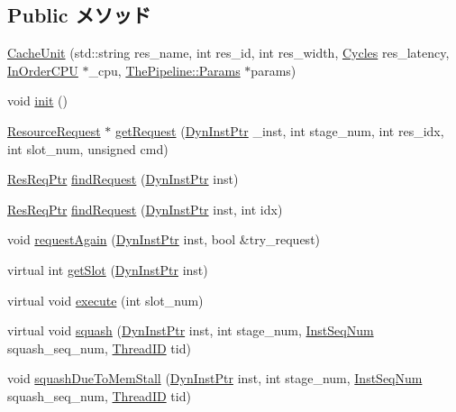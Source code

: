 \subsection*{Public メソッド}
\begin{DoxyCompactItemize}
\item 
\hyperlink{classCacheUnit_a24b18d6f820e0babe90abbfc838fc61c}{CacheUnit} (std::string res\_\-name, int res\_\-id, int res\_\-width, \hyperlink{classCycles}{Cycles} res\_\-latency, \hyperlink{classInOrderCPU}{InOrderCPU} $\ast$\_\-cpu, \hyperlink{namespaceThePipeline_ab62ca16eeca26566ad2422b5df4943ce}{ThePipeline::Params} $\ast$params)
\item 
void \hyperlink{classCacheUnit_a02fd73d861ef2e4aabb38c0c9ff82947}{init} ()
\item 
\hyperlink{classResourceRequest}{ResourceRequest} $\ast$ \hyperlink{classCacheUnit_aae5ce84f94a1057d7f60172daf5d731d}{getRequest} (\hyperlink{classRefCountingPtr}{DynInstPtr} \_\-inst, int stage\_\-num, int res\_\-idx, int slot\_\-num, unsigned cmd)
\item 
\hyperlink{classResourceRequest}{ResReqPtr} \hyperlink{classCacheUnit_ae3afc1c63d17a49a6301bd18fca574a0}{findRequest} (\hyperlink{classRefCountingPtr}{DynInstPtr} inst)
\item 
\hyperlink{classResourceRequest}{ResReqPtr} \hyperlink{classCacheUnit_abfbefbe2451158a25d064523dcb3d6bd}{findRequest} (\hyperlink{classRefCountingPtr}{DynInstPtr} inst, int idx)
\item 
void \hyperlink{classCacheUnit_a9063fd6f97e36e3565247339ffa3882c}{requestAgain} (\hyperlink{classRefCountingPtr}{DynInstPtr} inst, bool \&try\_\-request)
\item 
virtual int \hyperlink{classCacheUnit_ab3ba2ee95c723c8c056db0a1f2a6dfd3}{getSlot} (\hyperlink{classRefCountingPtr}{DynInstPtr} inst)
\item 
virtual void \hyperlink{classCacheUnit_a7b7fff82f8c9cbdb02add1346f60bb9e}{execute} (int slot\_\-num)
\item 
virtual void \hyperlink{classCacheUnit_a52235c5e3d912452f254dc45f1496fd2}{squash} (\hyperlink{classRefCountingPtr}{DynInstPtr} inst, int stage\_\-num, \hyperlink{inst__seq_8hh_a258d93d98edaedee089435c19ea2ea2e}{InstSeqNum} squash\_\-seq\_\-num, \hyperlink{base_2types_8hh_ab39b1a4f9dad884694c7a74ed69e6a6b}{ThreadID} tid)
\item 
void \hyperlink{classCacheUnit_ae2d6fba25ece343caad6eb029a4a3b5b}{squashDueToMemStall} (\hyperlink{classRefCountingPtr}{DynInstPtr} inst, int stage\_\-num, \hyperlink{inst__seq_8hh_a258d93d98edaedee089435c19ea2ea2e}{InstSeqNum} squash\_\-seq\_\-num, \hyperlink{base_2types_8hh_ab39b1a4f9dad884694c7a74ed69e6a6b}{ThreadID} tid)

\end{DoxyCompactItemize}
